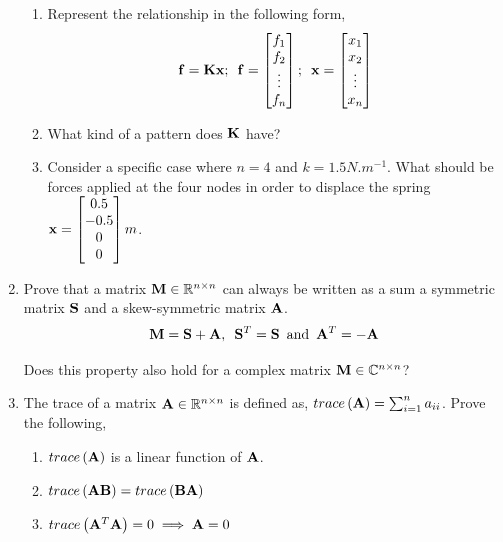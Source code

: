 \documentclass[9pt]{article}
\def\mf{\ensuremath\mathbf}
\def\mb{\ensuremath\mathbb}
\begin{document}
\begin{multicols}{2}
\begin{enumerate}
\begin{center}
    \end{center}
    \begin{enumerate}
        \item Represent the relationship in the following form,
        \[ \mf{f} = \mf{Kx}; \,\,\, \mf{f} = \begin{bmatrix}f_1\\ f_2\\ \vdots\\ f_n\end{bmatrix}; \,\,\, \mf{x} = \begin{bmatrix}x_1 \\ x_2 \\ \vdots \\ x_n\end{bmatrix}\]
        \item What kind of a pattern does $\mf{K}$ have?
        \item Consider a specific case where $n = 4$ and $k = 1.5 N.m^{-1}$. What should be forces applied at the four nodes in order to displace the spring $\mf{x} = \begin{bmatrix*} 0.5 \\ -0.5 \\ 0 \\ 0 \end{bmatrix*}m$. 
    \end{enumerate}

    \item Prove that a matrix $\mf{M} \in \mathbb{R}^{n \times n}$ can always be written as a sum a symmetric matrix $\mf{S}$ and a skew-symmetric matrix $\mf{A}$.
    \[ \mf{M} = \mf{S} + \mf{A}, \,\,\, \mf{S}^T = \mf{S} \, \text{ and } \, \mf{A}^T = -\mf{A} \]

    Does this property also hold for a complex matrix $\mf{M} \in \mb{C}^{n \times n}$?
    \item The trace of a matrix $\mf{A} \in \mb{R}^{n \times n}$ is defined as, $trace\left(\mf{A}\right) = \sum_{i=1}^{n}a_{ii}$. Prove the following,
    \begin{enumerate}
        \item $trace\left(\mf{A}\right)$ is a linear function of $\mf{A}$.
        \item $trace\left(\mf{AB}\right) = trace\left(\mf{BA}\right)$
        \item $trace\left(\mf{A}^T\mf{A}\right) = 0 \implies \mf{A} = 0$
    \end{enumerate}


\end{enumerate}
\end{multicols}
\end{document}

